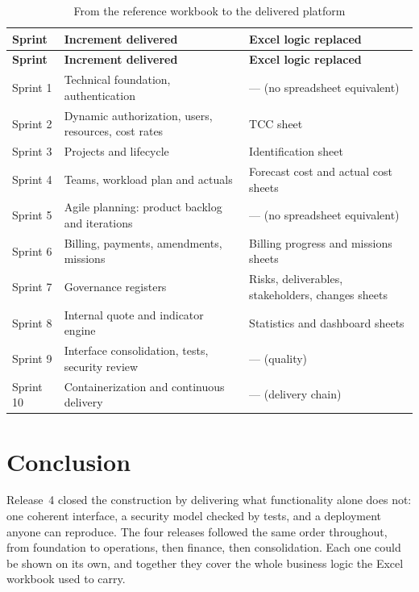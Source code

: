 \begin{longtable}{|m{2.0cm}|m{5.6cm}|m{6.8cm}|}
\caption{From the reference workbook to the delivered platform}\label{tab:final}\\
\hline
\textbf{Sprint} & \textbf{Increment delivered} & \textbf{Excel logic replaced} \\
\hline
\endfirsthead
\hline
\textbf{Sprint} & \textbf{Increment delivered} & \textbf{Excel logic replaced} \\
\hline
\endhead
\endfoot
\endlastfoot
\hline
Sprint 1 & Technical foundation, authentication & --- (no spreadsheet equivalent) \\
\hline
Sprint 2 & Dynamic authorization, users, resources, cost rates & TCC sheet \\
\hline
Sprint 3 & Projects and lifecycle & Identification sheet \\
\hline
Sprint 4 & Teams, workload plan and actuals & Forecast cost and actual cost sheets \\
\hline
Sprint 5 & Agile planning: product backlog and iterations & --- (no spreadsheet equivalent) \\
\hline
Sprint 6 & Billing, payments, amendments, missions & Billing progress and missions sheets \\
\hline
Sprint 7 & Governance registers & Risks, deliverables, stakeholders, changes sheets \\
\hline
Sprint 8 & Internal quote and indicator engine & Statistics and dashboard sheets \\
\hline
Sprint 9 & Interface consolidation, tests, security review & --- (quality) \\
\hline
Sprint 10 & Containerization and continuous delivery & --- (delivery chain) \\
\hline
\end{longtable}

\section*{Conclusion}
Release~4 closed the construction by delivering what functionality alone does not: one coherent
interface, a security model checked by tests, and a deployment anyone can reproduce. The four
releases followed the same order throughout, from foundation to operations, then finance, then
consolidation. Each one could be shown on its own, and together they cover the whole business
logic the Excel workbook used to carry.
